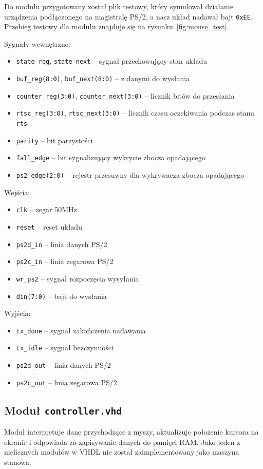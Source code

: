 Do modułu przygotowany został plik testowy, który symulował działanie urządzenia
podłączonego na magistralę PS/2, a nasz układ nadawał bajt \texttt{0xEE}.
Przebieg testowy dla modułu znajduje się na rysunku~\ref{fig:mouse_test}.
\vspace{1em}

Sygnały wewnętrzne:
\begin{itemize}
  \item \texttt{state\_reg}, \texttt{state\_next} -- sygnał przechowujący stan
    układu
  \item \texttt{buf\_reg(8:0)}, \texttt{buf\_next(8:0)} -- z danymi do wysłania
  \item \texttt{counter\_reg(3:0)}, \texttt{counter\_next(3:0)} -- licznik bitów
    do przesłania
  \item \texttt{rtsc\_reg(3:0)}, \texttt{rtsc\_next(3:0)} -- licznik czasu
    oczekiwania podczas stanu \texttt{rts}
  \item \texttt{parity} -- bit parzystości
  \item \texttt{fall\_edge} -- bit sygnalizujący wykrycie zbocza opadającego
  \item \texttt{ps2\_edge(2:0)} -- rejestr przesuwny dla wykrywacza zbocza
    opadającego
\end{itemize}
\vspace{1em}
Wejścia:
\begin{itemize}
  \item \texttt{clk} -- zegar 50MHz
  \item \texttt{reset} -- reset układu
  \item \texttt{ps2d\_in} -- linia danych PS/2
  \item \texttt{ps2c\_in} -- linia zegarowa PS/2
  \item \texttt{wr\_ps2} -- sygnał rozpoczęcia wysyłania
  \item \texttt{din(7:0)} -- bajt do wysłania
\end{itemize}
\vspace{1em}
Wyjścia:
\begin{itemize}
  \item \texttt{tx\_done} -- sygnał zakończenia nadawania
  \item \texttt{tx\_idle} -- sygnał bezczynności
  \item \texttt{ps2d\_out} -- linia danych PS/2
  \item \texttt{ps2c\_out} -- linia zegarowa PS/2
\end{itemize}

\subsection{Moduł \texttt{controller.vhd}}
Moduł interpretuje dane przychodzące z myszy, aktualizuje położenie kursora na
ekranie i odpowiada za zapisywanie danych do pamięci RAM. Jako jeden z
nielicznych modułów w VHDL nie został zaimplementowany jako maszyna stanowa.
\vspace{1em}

